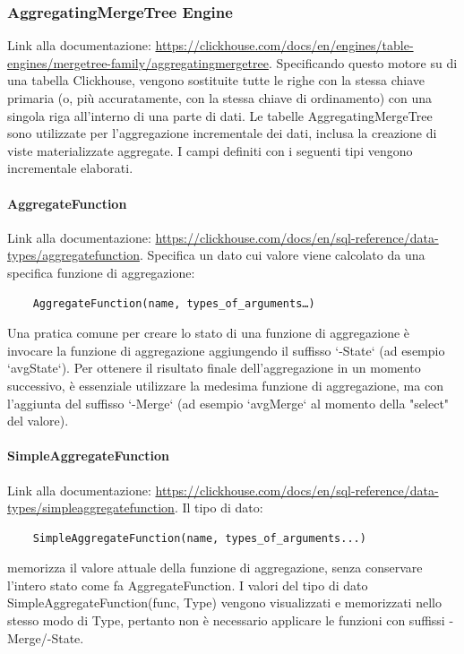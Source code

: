 \subsubsection{AggregatingMergeTree Engine} \label{sec:AggregatingMergeTree}
Link alla documentazione: \href{https://clickhouse.com/docs/en/engines/table-engines/mergetree-family/aggregatingmergetree}{https://clickhouse.com/docs/en/engines/table-engines/mergetree-family/aggregatingmergetree}.\newline
 Specificando questo motore su di una tabella Clickhouse, vengono sostituite tutte le righe con la stessa chiave primaria (o, più accuratamente, con la stessa chiave di ordinamento) con una singola riga all'interno di una parte di dati.
 Le tabelle AggregatingMergeTree sono utilizzate per l'aggregazione incrementale dei dati, inclusa la creazione di viste materializzate aggregate.
 I campi definiti con i seguenti tipi vengono incrementale elaborati.

\paragraph{AggregateFunction}
Link alla documentazione: \href{https://clickhouse.com/docs/en/sql-reference/data-types/aggregatefunction}{https://clickhouse.com/docs/en/sql-reference/data-types/aggregatefunction}.\newline
Specifica un dato cui valore viene calcolato da una specifica funzione di aggregazione: 
\begin{verbatim}
    AggregateFunction(name, types_of_arguments…) 
\end{verbatim}
Una pratica comune per creare lo stato di una funzione di aggregazione è invocare la funzione di aggregazione aggiungendo il suffisso `-State` (ad esempio `avgState`). Per ottenere il risultato finale dell'aggregazione in un momento successivo, è essenziale utilizzare la medesima funzione di aggregazione, ma con l'aggiunta del suffisso `-Merge` (ad esempio `avgMerge` al momento della "select" del valore).
\paragraph{SimpleAggregateFunction}
Link alla documentazione: \href{https://clickhouse.com/docs/en/sql-reference/data-types/simpleaggregatefunction}{https://clickhouse.com/docs/en/sql-reference/data-types/simpleaggregatefunction}.\newline
Il tipo di dato:
\begin{verbatim}
    SimpleAggregateFunction(name, types_of_arguments...)
\end{verbatim}  memorizza il valore attuale della funzione di aggregazione, senza conservare l'intero stato come fa AggregateFunction.
I valori del tipo di dato SimpleAggregateFunction(func, Type) vengono visualizzati e memorizzati nello stesso modo di Type, pertanto non è necessario applicare le funzioni con suffissi -Merge/-State.

